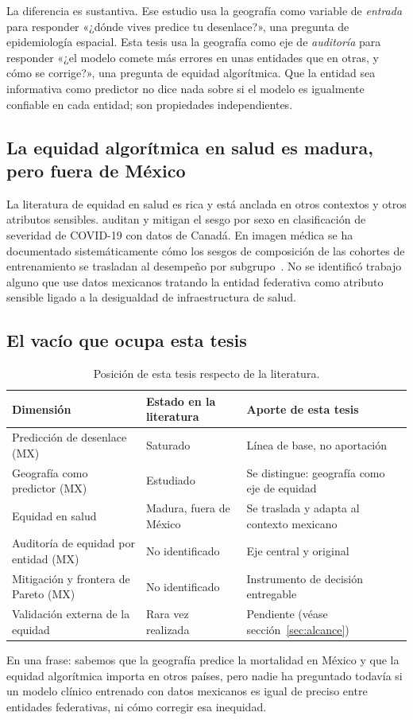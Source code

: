 La diferencia es sustantiva. Ese estudio usa la geografía como variable de
\emph{entrada} para responder «¿dónde vives predice tu desenlace?»,
una pregunta de epidemiología espacial. Esta tesis usa la geografía como eje de
\emph{auditoría} para responder «¿el modelo comete más errores en unas entidades
que en otras, y cómo se corrige?», una pregunta de equidad algorítmica. Que la
entidad sea informativa como predictor no dice nada sobre si el modelo es
igualmente confiable en cada entidad; son propiedades independientes.

\subsection{La equidad algorítmica en salud es madura, pero fuera de México}

La literatura de equidad en salud es rica y está anclada en otros contextos y
otros atributos sensibles. \textcite{nejadshamsi2026} auditan y
mitigan el sesgo por sexo en clasificación de severidad de COVID-19 con datos de
Canadá. En imagen médica se ha documentado sistemáticamente cómo los sesgos de
composición de las cohortes de entrenamiento se trasladan al desempeño por
subgrupo~\parencite{riccilara2022}. No se identificó trabajo alguno que use datos
mexicanos tratando la entidad federativa como atributo sensible ligado a la
desigualdad de infraestructura de salud.

\subsection{El vacío que ocupa esta tesis}

\begin{table}[htbp]
\centering
\caption{Posición de esta tesis respecto de la literatura.}
\label{tab:vacio}
\small
\begin{tabular}{p{4.6cm} p{4.6cm} p{4.6cm}}
\toprule
Dimensión & Estado en la literatura & Aporte de esta tesis \\
\midrule
Predicción de desenlace (MX) & Saturado & Línea de base, no aportación \\
Geografía como predictor (MX) & Estudiado & Se distingue: geografía como eje de equidad \\
Equidad en salud & Madura, fuera de México & Se traslada y adapta al contexto mexicano \\
Auditoría de equidad por entidad (MX) & No identificado & Eje central y original \\
Mitigación y frontera de Pareto (MX) & No identificado & Instrumento de decisión entregable \\
Validación externa de la equidad & Rara vez realizada & Pendiente (véase sección~\ref{sec:alcance}) \\
\bottomrule
\end{tabular}
\end{table}

En una frase: sabemos que la geografía predice la mortalidad en México y que la
equidad algorítmica importa en otros países, pero nadie ha preguntado todavía si
un modelo clínico entrenado con datos mexicanos es igual de preciso entre
entidades federativas, ni cómo corregir esa inequidad.
